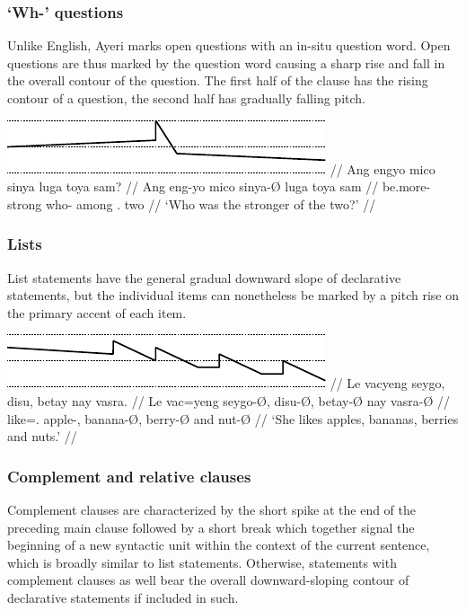 \subsubsection{`Wh-' questions}

Unlike English, Ayeri marks open questions with an in-situ question word.
Open questions are thus marked by the question word causing a sharp rise and 
fall in the overall contour of the question. The first half of the clause has 
the rising contour of a question, the second half has gradually falling pitch.

\ex[belowexskip=0em]\begingl
	\glpreamble \raisebox{-1.5em}
		{\includegraphics{images/contours-whquestion.pdf}} //
	\gla Ang engyo mico sinya luga toya sam? //
	\glb Ang eng-yo mico sinya-Ø luga toya sam //
	\glc \AgtT{} be.more-\TsgN{} strong who-\Top{} among \TplN{}.\Loc{}
		two //
	\glft `Who was the stronger of the two?' //
\endgl\xe

\subsubsection{Lists}

List statements have the general gradual downward slope of 
declarative statements, but the individual items can nonetheless be marked by a 
pitch rise on the primary accent of each item.

\ex[belowexskip=0em]\begingl
	\glpreamble \raisebox{-1.5em}
		{\includegraphics{images/contours-list.pdf}} //
	\gla Le vacyeng seygo, disu, betay nay vasra. //
	\glb Le vac=yeng seygo-Ø, disu-Ø, betay-Ø nay vasra-Ø //
	\glc \PatTI{} like=\TsgF{}.\Aarg{} apple-\Top{}, banana-Ø, berry-Ø and
		nut-Ø //
	\glft `She likes apples, bananas, berries and nuts.' //
\endgl\xe

\subsubsection{Complement and relative clauses}

Complement clauses are characterized by the short 
spike at the end of the preceding main clause followed by a short break which 
together signal the beginning of a new syntactic unit within the context of 
the current sentence, which is broadly similar to list statements. Otherwise, 
statements with complement clauses as well bear the overall downward-sloping 
contour of declarative statements if included in such.

